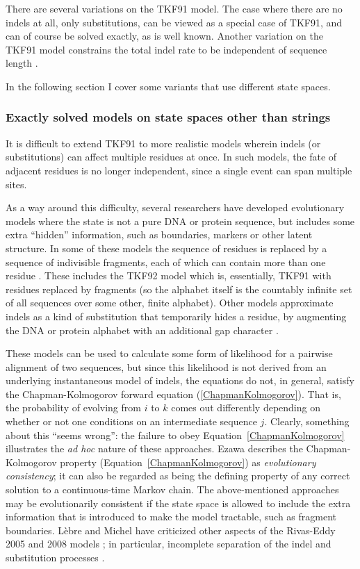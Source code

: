 \documentclass{bmcart}
\newcommand{\eqref}[1]{Equation~\ref{#1}}
\begin{document}
There are several variations on the TKF91 model.
The case where there are no indels at all, only substitutions, can be viewed as a special case of TKF91,
and can of course be solved exactly, as is well known.
Another variation on the TKF91 model constrains the total indel rate to be independent of sequence
length \cite{BouchardCoteJordan2013}.

In the following section I cover some variants that use different state spaces.

\subsubsection*{Exactly solved models on state spaces other than strings}

It is difficult to extend TKF91 to more realistic models wherein indels (or substitutions)
can affect multiple residues at once.
In such models, the fate of adjacent residues is no longer independent, since a single event can span multiple sites.

As a way around this difficulty, several researchers have developed
evolutionary models where the state is not a pure DNA or protein sequence,
but includes some extra ``hidden'' information,
such as boundaries, markers or other latent structure.
In some of these models the sequence of residues is replaced by a sequence of indivisible fragments,
each of which can contain more than one residue \cite{ThorneEtal92,Metzler2003,RivasEddy2015}.
These includes the TKF92 model \cite{ThorneEtal92} which is, essentially, TKF91 with residues replaced by
fragments (so the alphabet itself is the countably infinite set of all sequences over some other, finite alphabet).
Other models approximate indels as a kind of substitution that temporarily hides a residue,
by augmenting the DNA or protein alphabet with an additional gap character \cite{McGuireEtAl2001,Rivas05,RivasEddy2008}.

These models can be used to calculate some form of likelihood for a pairwise alignment of two sequences,
but since this likelihood is not derived from an underlying instantaneous model of indels,
the equations do not, in general, satisfy the Chapman-Kolmogorov forward equation
(\ref{ChapmanKolmogorov}).
That is, the probability of evolving from $i$ to $k$ comes out differently
depending on whether or not one conditions on an intermediate sequence $j$.
Clearly, something about this ``seems wrong'':
the failure to obey \eqref{ChapmanKolmogorov} illustrates the {\em ad hoc}
nature of these approaches.
Ezawa \cite{Ezawa2016b} describes the Chapman-Kolmogorov property
(\eqref{ChapmanKolmogorov}) as {\em evolutionary consistency};
it can also be regarded as being the defining property
of any correct solution to a continuous-time Markov chain.
The above-mentioned approaches may be evolutionarily consistent if the state space
is allowed to include the extra information that is introduced to make the model tractable,
such as fragment boundaries.
L\`{e}bre and Michel have criticized other aspects of the Rivas-Eddy 2005 and 2008 models \cite{Rivas05,RivasEddy2008};
in particular, incomplete separation of the indel and substitution processes \cite{pmid22644340}.
\end{document}
